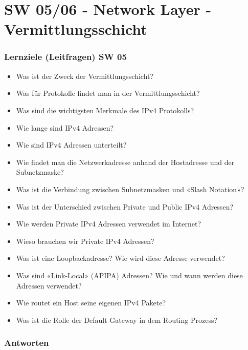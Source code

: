 \part{SW 05/06 - Network Layer - Vermittlungsschicht}\label{part:sw0506}
\section{Lernziele (Leitfragen) SW 05}
\begin{itemize}
    \item Was ist der Zweck der Vermittlungsschicht?
    \item Was für Protokolle findet man in der Vermittlungsschicht?
    \item Was sind die wichtigsten Merkmale des IPv4 Protokolls?
    \item Wie lange sind IPv4 Adressen?
    \item Wie sind IPv4 Adressen unterteilt?
    \item Wie findet man die Netzwerkadresse anhand der Hostadresse und der Subnetzmaske?
    \item Was ist die Verbindung zwischen Subnetzmasken und «Slash Notation»?
    \item Was ist der Unterschied zwischen Private und Public IPv4 Adressen?
    \item Wie werden Private IPv4 Adressen verwendet im Internet?
    \item Wieso brauchen wir Private IPv4 Adressen?
    \item Was ist eine Loopbackadresse? Wie wird diese Adresse verwendet?
    \item Was sind «Link-Local» (APIPA) Adressen? Wie und wann werden diese Adressen verwendet?
    \item Wie routet ein Host seine eigenen IPv4 Pakete?
    \item Was ist die Rolle der Default Gateway in dem Routing Prozess?
\end{itemize}

\section{Antworten}
